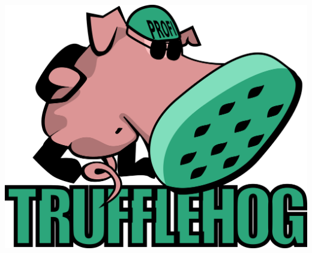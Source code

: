 \documentclass[18pt]{beamer}
\begin{document}
\begin{frame}
	\centering
	\includegraphics[width=0.8\linewidth]{images/title}
\end{frame}

\appendix
\beginbackup


\backupend
\end{document}
